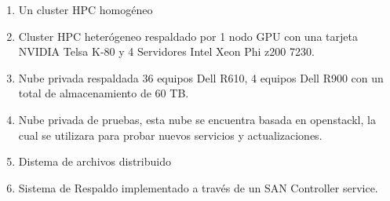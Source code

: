\begin{enumerate}
	\item Un cluster HPC homogéneo 
	\item Cluster HPC heterógeneo respaldado por 1 nodo GPU con una tarjeta NVIDIA Telsa K-80 y 4 Servidores Intel Xeon Phi z200 7230.
	\item Nube privada respaldada 36 equipos Dell R610, 4 equipos Dell R900 con un total de almacenamiento de 60 TB.
	\item Nube privada de pruebas, esta nube se encuentra basada en openstackl, la cual se utilizara para probar nuevos servicios y actualizaciones.
	\item Distema de archivos distribuido
	\item Sistema de Respaldo implementado a través de un SAN Controller service.
\end{enumerate}